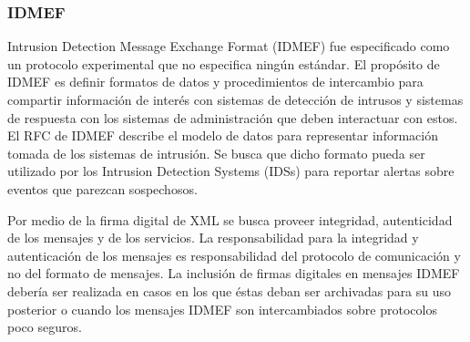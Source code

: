 \subsubsection{IDMEF}

Intrusion Detection Message Exchange Format (IDMEF) fue especificado como un 
protocolo experimental que no especifica ningún estándar. El propósito de 
IDMEF es definir formatos de datos y procedimientos de intercambio para 
compartir información de interés con sistemas de detección de intrusos y 
sistemas de respuesta con los sistemas de administración que deben 
interactuar con estos. El RFC de IDMEF describe el modelo de datos para 
representar información tomada de los sistemas de intrusión. Se busca que dicho 
formato pueda ser utilizado por los Intrusion Detection Systems (IDSs) para 
reportar alertas sobre eventos que parezcan sospechosos.

Por medio de la firma digital de XML se busca proveer integridad, autenticidad de 
los mensajes y de los servicios. La responsabilidad para la integridad y 
autenticación de los mensajes es responsabilidad del protocolo de comunicación y 
no del formato de mensajes. La inclusión de firmas digitales en mensajes IDMEF 
debería ser realizada en casos en los que éstas deban ser archivadas para su uso 
posterior o cuando los mensajes IDMEF son intercambiados sobre protocolos poco 
seguros.

